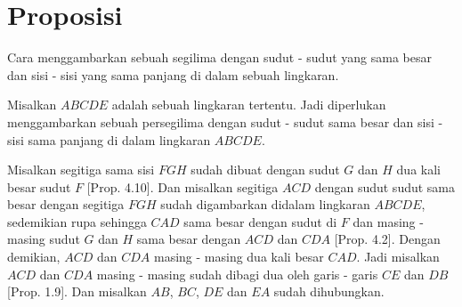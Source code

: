 \documentclass[a4paper]{book}
\begin{document}
\section*{\centering Proposisi \thesection}
Cara menggambarkan sebuah segilima dengan sudut - sudut yang sama besar dan
sisi - sisi yang sama panjang di dalam sebuah lingkaran.
\begin{center} 
\end{center}

Misalkan $ABCDE$ adalah sebuah lingkaran tertentu. Jadi diperlukan 
menggambarkan sebuah persegilima dengan sudut - sudut sama besar dan sisi - 
sisi sama panjang di dalam lingkaran $ABCDE$.

Misalkan segitiga sama sisi $FGH$ sudah dibuat dengan sudut $G$ dan $H$ dua
kali besar sudut $F$ [Prop. 4.10]. Dan misalkan segitiga $ACD$ dengan sudut
sudut sama besar dengan segitiga $FGH$ sudah digambarkan didalam lingkaran
$ABCDE$, sedemikian rupa sehingga $CAD$ sama besar dengan sudut di $F$ dan
masing - masing sudut $G$ dan $H$ sama besar dengan $ACD$ dan $CDA$ 
[Prop. 4.2]. Dengan demikian, $ACD$ dan $CDA$ masing - masing dua kali 
besar $CAD$. Jadi misalkan $ACD$ dan $CDA$ masing - masing
sudah dibagi dua oleh garis - garis $CE$ dan $DB$ [Prop. 1.9]. Dan misalkan
$AB$, $BC$, $DE$ dan $EA$ sudah dihubungkan.
\end{document}
